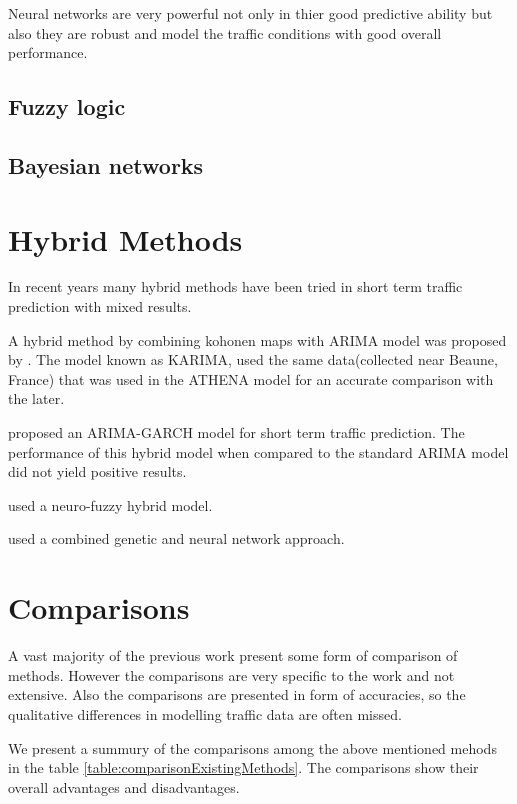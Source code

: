 Neural networks are very powerful not only in thier good predictive ability but also they are robust
and model the traffic conditions with good overall performance.

\subsection{Fuzzy logic}

\citet{zhang2008short}

\subsection{Bayesian networks}

\citet{castillo2008predicting}


\section{Hybrid Methods}
In recent years many hybrid methods have been tried in short term traffic prediction with mixed
results.

A hybrid method by combining kohonen maps with ARIMA model was proposed by \citet{van1996combining}.
The model known as KARIMA, used the same data(collected near Beaune, France) that was used in the
ATHENA model for an accurate comparison with the later.

\citet{chen2011short} proposed an ARIMA-GARCH model for short term traffic prediction. The
performance of this hybrid model when compared to the standard ARIMA model did not yield positive
results.

\citet{ishak2004optimizing} used a neuro-fuzzy hybrid model.

\citet{vlahogianni2005optimized} used a combined genetic and neural network approach.

\section{Comparisons}
A vast majority of the previous work present some form of comparison of methods. However the
comparisons are very specific to the work and not extensive. Also the comparisons are presented in
form of accuracies, so the qualitative differences in modelling traffic data are often missed.

We present a summury of the comparisons among the above mentioned mehods in the table
\ref{table:comparisonExistingMethods}. The comparisons show their overall advantages and disadvantages.

